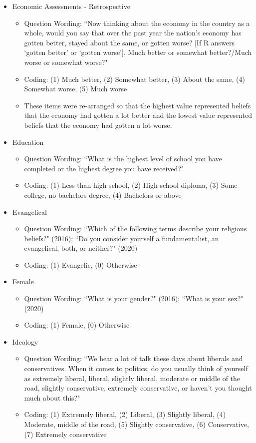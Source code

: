 \begin{itemize}
	\item Economic Assessments - Retrospective
		\begin{itemize}
			\item Question Wording: ``Now thinking about the economy in the country as a whole, would you say that over the past year the nation's economy has gotten better, stayed about the same, or gotten worse? [If R answers `gotten better' or `gotten worse'], Much better or somewhat better?/Much worse or somewhat worse?"
			\item Coding: (1) Much better, (2) Somewhat better, (3) About the same, (4) Somewhat worse, (5) Much worse
			\item These items were re-arranged so that the highest value represented beliefs that the economy had gotten a lot better and the lowest value represented beliefs that the economy had gotten a lot worse.
		\end{itemize}
		
	\item Education
		\begin{itemize}
			\item Question Wording: ``What is the highest level of school you have completed or the highest degree you have received?"
			\item Coding: (1) Less than high school, (2) High school diploma, (3) Some college, no bachelors degree, (4) Bachelors or above
		\end{itemize}
		
	\item Evangelical
		\begin{itemize}
			\item Question Wording: ``Which of the following terms describe your religious beliefs?" (2016); ``Do you consider yourself a fundamentalist, an evangelical, both, or neither?" (2020)
			\item Coding: (1) Evangelic, (0) Otherwise
		\end{itemize}
		
	\item Female
		\begin{itemize}
			\item Question Wording: ``What is your gender?" (2016); ``What is your sex?" (2020)
			\item Coding: (1) Female, (0) Otherwise
		\end{itemize}
		
	\item Ideology 
		\begin{itemize}
			\item Question Wording: ``We hear a lot of talk these days about liberals and conservatives. When it comes to politics, do you usually think of yourself as extremely liberal, liberal, slightly liberal, moderate or middle of the road, slightly conservative, extremely conservative, or haven't you thought much about this?"
			\item Coding: (1) Extremely liberal, (2) Liberal, (3) Slightly liberal, (4) Moderate, middle of the road, (5) Slightly conservative, (6) Conservative, (7) Extremely conservative 
		\end{itemize}
		

\end{itemize}
